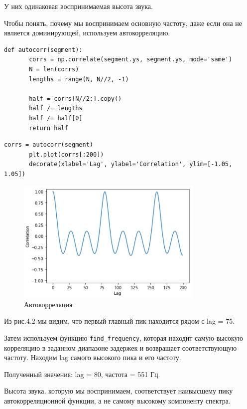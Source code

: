 \documentclass[a4paper,12pt]{report}
\begin{document}
    У них одинаковая воспринимаемая высота звука.

    Чтобы понять, почему мы воспринимаем основную частоту, даже если она не является доминирующей, используем автокорреляцию.
\begin{lstlisting}[caption=Функция автокорреляции]
       def autocorr(segment):
       corrs = np.correlate(segment.ys, segment.ys, mode='same')
       N = len(corrs)
       lengths = range(N, N//2, -1)

       half = corrs[N//2:].copy()
       half /= lengths
       half /= half[0]
       return half
\end{lstlisting}      
\begin{lstlisting}[caption=Применение функции]
       corrs = autocorr(segment)
       plt.plot(corrs[:200])
       decorate(xlabel='Lag', ylabel='Correlation', ylim=[-1.05, 1.05])
\end{lstlisting}
\begin{figure}[H]
        \centering
        \includegraphics[width=0.8\textwidth]{fig4-2.PNG}
        \caption{Автокорреляция}
        \label{fig:fig4-2}
\end{figure}
    
    Из рис.4.2 мы видим, что первый главный пик находится рядом с lag = 75.
    
    Затем используем функцию \texttt{find\_frequency}, которая находит самую высокую корреляцию в заданном диапазоне задержек и возвращает соответствующую частоту. Находим lag самого высокого пика и его частоту. 
    
    Полученный значения: lag = 80, частота = 551 Гц.
    
    Высота звука, которую мы воспринимаем, соответствует наивысшему пику автокорреляционной функции, а не самому высокому компоненту спектра.
    
\end{document}

